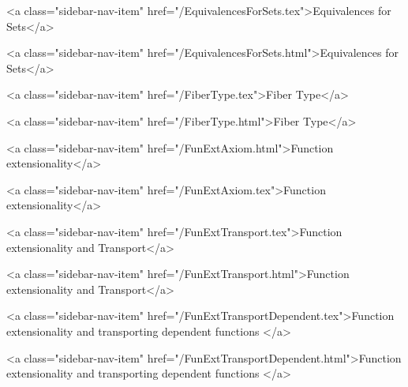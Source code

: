       
    
      
        
          <a class="sidebar-nav-item" href="/EquivalencesForSets.tex">Equivalences for Sets</a>
        
      
    
      
        
          <a class="sidebar-nav-item" href="/EquivalencesForSets.html">Equivalences for Sets</a>
        
      
    
      
        
          <a class="sidebar-nav-item" href="/FiberType.tex">Fiber Type</a>
        
      
    
      
        
          <a class="sidebar-nav-item" href="/FiberType.html">Fiber Type</a>
        
      
    
      
        
          <a class="sidebar-nav-item" href="/FunExtAxiom.html">Function extensionality</a>
        
      
    
      
        
          <a class="sidebar-nav-item" href="/FunExtAxiom.tex">Function extensionality</a>
        
      
    
      
        
          <a class="sidebar-nav-item" href="/FunExtTransport.tex">Function extensionality and Transport</a>
        
      
    
      
        
          <a class="sidebar-nav-item" href="/FunExtTransport.html">Function extensionality and Transport</a>
        
      
    
      
        
          <a class="sidebar-nav-item" href="/FunExtTransportDependent.tex">Function extensionality and transporting dependent functions </a>
        
      
    
      
        
          <a class="sidebar-nav-item" href="/FunExtTransportDependent.html">Function extensionality and transporting dependent functions </a>
        
      
    
